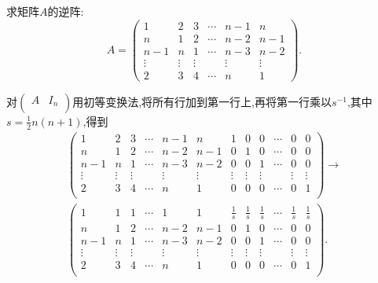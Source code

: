 \documentclass[lang=cn,newtx,10pt,scheme=chinese]{elegantbook}
\begin{document}
\begin{exercise}
    求矩阵\(A\)的逆阵:
\[
A = 
\begin{pmatrix}
1 & 2 & 3 & \cdots & n - 1 & n \\
n & 1 & 2 & \cdots & n - 2 & n - 1 \\
n - 1 & n & 1 & \cdots & n - 3 & n - 2 \\
\vdots & \vdots & \vdots & & \vdots & \vdots \\
2 & 3 & 4 & \cdots & n & 1
\end{pmatrix}.
\]
\end{exercise}
\begin{solution}
    对\(\left( \begin{matrix}
        A&		I_n\\
    \end{matrix} \right) \)用初等变换法,将所有行加到第一行上,再将第一行乘以\(s^{-1}\),其中\(s = \frac{1}{2}n(n + 1)\),得到
    \setcounter{MaxMatrixCols}{20} %
    \begin{gather*}
        \left( \begin{matrix}
            1&		2&		3&		\cdots&		n-1&		n&		1&		0&		0&		\cdots&		0&		0\\
            n&		1&		2&		\cdots&		n-2&		n-1&		0&		1&		0&		\cdots&		0&		0\\
            n-1&		n&		1&		\cdots&		n-3&		n-2&		0&		0&		1&		\cdots&		0&		0\\
            \vdots&		\vdots&		\vdots&		&		\vdots&		\vdots&		\vdots&		\vdots&		\vdots&		&		\vdots&		\vdots\\
            2&		3&		4&		\cdots&		n&		1&		0&		0&		0&		\cdots&		0&		1\\
        \end{matrix} \right) \rightarrow
        \\
        \left( \begin{matrix}
            1&		1&		1&		\cdots&		1&		1&		\frac{1}{s}&		\frac{1}{s}&		\frac{1}{s}&		\cdots&		\frac{1}{s}&		\frac{1}{s}\\
            n&		1&		2&		\cdots&		n-2&		n-1&		0&		1&		0&		\cdots&		0&		0\\
            n-1&		n&		1&		\cdots&		n-3&		n-2&		0&		0&		1&		\cdots&		0&		0\\
            \vdots&		\vdots&		\vdots&		&		\vdots&		\vdots&		\vdots&		\vdots&		\vdots&		&		\vdots&		\vdots\\
            2&		3&		4&		\cdots&		n&		1&		0&		0&		0&		\cdots&		0&		1\\
        \end{matrix} \right) .

\end{gather*}
\end{solution}
\end{document}
